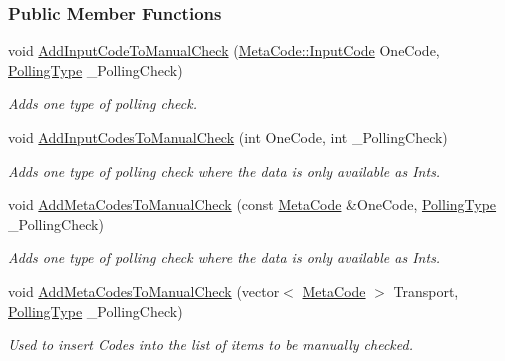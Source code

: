 \subsubsection*{Public Member Functions}
\begin{DoxyCompactItemize}
\item 
void \hyperlink{structphys_1_1internal_1_1EventManagerInternalData_abf8c7b472e4b19a0c0243dcaf49a38ae}{AddInputCodeToManualCheck} (\hyperlink{classphys_1_1MetaCode_a3e501cbb5bf0f6f1fdb7211465bda8d8}{MetaCode::InputCode} OneCode, \hyperlink{structphys_1_1internal_1_1EventManagerInternalData_ab9ab8380b84448aacf46a63050e159af}{PollingType} \_\-PollingCheck)
\begin{DoxyCompactList}\small\item\em Adds one type of polling check. \item\end{DoxyCompactList}\item 
void \hyperlink{structphys_1_1internal_1_1EventManagerInternalData_a3f562c06139a3712bdb5ff843b3973bc}{AddInputCodesToManualCheck} (int OneCode, int \_\-PollingCheck)
\begin{DoxyCompactList}\small\item\em Adds one type of polling check where the data is only available as Ints. \item\end{DoxyCompactList}\item 
void \hyperlink{structphys_1_1internal_1_1EventManagerInternalData_a792d2c7bb8fe9e169e01650ca92f939e}{AddMetaCodesToManualCheck} (const \hyperlink{classphys_1_1MetaCode}{MetaCode} \&OneCode, \hyperlink{structphys_1_1internal_1_1EventManagerInternalData_ab9ab8380b84448aacf46a63050e159af}{PollingType} \_\-PollingCheck)
\begin{DoxyCompactList}\small\item\em Adds one type of polling check where the data is only available as Ints. \item\end{DoxyCompactList}\item 
void \hyperlink{structphys_1_1internal_1_1EventManagerInternalData_ac2e4044e2fc6eb2df18a3e274c175065}{AddMetaCodesToManualCheck} (vector$<$ \hyperlink{classphys_1_1MetaCode}{MetaCode} $>$ Transport, \hyperlink{structphys_1_1internal_1_1EventManagerInternalData_ab9ab8380b84448aacf46a63050e159af}{PollingType} \_\-PollingCheck)
\begin{DoxyCompactList}\small\item\em Used to insert Codes into the list of items to be manually checked. \item\end{DoxyCompactList}\item 

\end{DoxyCompactItemize}
